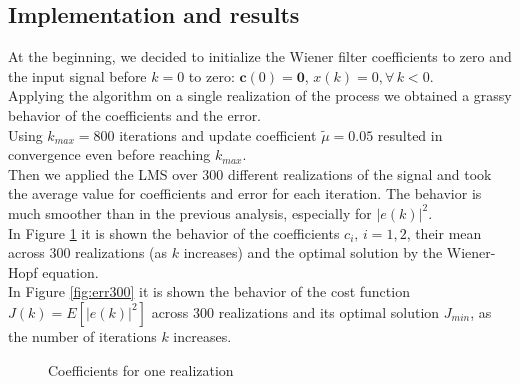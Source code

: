 \documentclass[a4paper, 12pt]{report}
\begin{document}
\subsection*{Implementation and results}
At the beginning, we decided to initialize the Wiener filter coefficients to zero and the input signal before $k=0$ to zero: $\mathbf{c}(0) = \mathbf{0}$, $x(k) = 0, \forall \, k<0$. \\
Applying the algorithm on a single realization of the process we obtained a grassy behavior of the coefficients and the error.\\
Using $k_{max} = 800$ iterations and update coefficient $\tilde{\mu} = 0.05$ resulted in convergence even before reaching $k_{max}$.\\
Then we applied the LMS over 300 different realizations of the signal and took the average value for coefficients and error for each iteration. The behavior is much smoother than in the previous analysis, especially for $|e(k)|^2$.\\
In Figure \ref{fig:coeff1} it is shown the behavior of the coefficients $c_i, \, i=1,2$,  their mean across 300 realizations (as $k$ increases) and the optimal solution by the Wiener-Hopf equation.\\
In Figure \ref{fig:err300} it is shown the behavior of the cost function $J(k) = E \left[ |e(k)|^2 \right]$  across 300 realizations and its optimal solution $J_{min}$, as the number of iterations $k$ increases.

\begin{figure}[H]
	\centering
	\caption{Coefficients for one realization}
	\label{fig:coeff1}
\end{figure}
\end{document}
